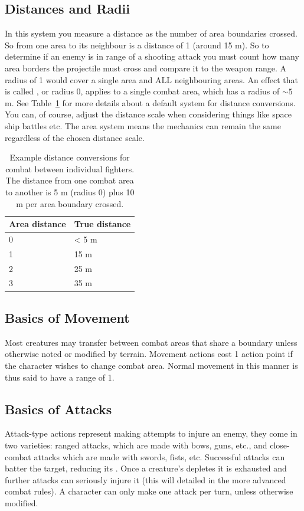 \documentclass[a4paper,10pt,oneside]{book}
\newcommand{\textlf}[1]{\textbf{\titlecap{#1}}}
\newcommand{\textlfirst}[1]{\textbf{\textit{\titlecap{#1}}}}
\begin{document}
\subsection{Distances and Radii}
In this system you measure a distance as the number of area boundaries crossed. So from one area to its neighbour is a distance of 1 (around 15 m). So to determine if an enemy is in range of a shooting attack you must count how many area borders the projectile must cross and compare it to the weapon range. A radius of 1 would cover a single area and ALL neighbouring areas. An effect that is called \textlfirst{adjacent}, or radius 0, applies to a single combat area, which has a radius of $\sim 5$ m. See Table~\ref{tab:distances} for more details about a default system for distance conversions. You can, of course, adjust the distance scale when considering things like space ship battles etc. The area system means the mechanics can remain the same regardless of the chosen distance scale. 

\begin{table}[ht!]
	\centering
	\begin{tabular}{|l|l|}
		\hline
		Area distance & True distance \\
		\hline
		0 & < 5 m \\
		1 & 15 m \\
		2 & 25 m \\
		3 & 35 m\\
		\hline
	\end{tabular}
	\caption{Example distance conversions for combat between individual fighters. The distance from one combat area to another is 5 m (radius 0) plus 10 m per area boundary crossed.}
	\label{tab:distances}
\end{table} 

\subsection{Basics of Movement}
Most creatures may transfer between combat areas that share a boundary unless otherwise noted or modified by terrain. Movement actions cost 1 action point if the character wishes to change combat area. Normal movement in this manner is thus said to have a range of 1. 

\subsection{Basics of Attacks}
Attack-type actions represent making attempts to injure an enemy, they come in two varieties: ranged attacks, which are made with bows, guns, etc., and close-combat attacks which are made with swords, fists, etc. Successful attacks can batter the target, reducing its \textlf{endurance}. Once a creature's \textlf{endurance} depletes it is exhausted and further attacks can seriously injure it (this will detailed in the more advanced combat rules). A character can only make one attack per turn, unless otherwise modified. 
\end{document}
